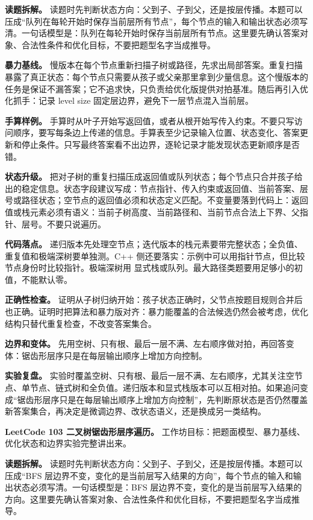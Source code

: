 \textbf{读题拆解。} 读题时先判断状态方向：父到子、子到父，还是按层传播。本题可以压成“队列在每轮开始时保存当前层所有节点”，每个节点的输入和输出状态必须写清。一句话模型是：队列在每轮开始时保存当前层所有节点。这里要先确认答案对象、合法性条件和优化目标，不要把题型名字当成推导。

\textbf{暴力基线。} 慢版本在每个节点重新扫描子树或路径，先求出局部答案。重复扫描暴露了真正状态：每个节点只需要从孩子或父亲那里拿到少量信息。这个慢版本的任务是保证不漏答案；它不追求快，只负责给优化版提供对拍基准。随后再引入优化抓手：记录 level size 固定层边界，避免下一层节点混入当前层。

\textbf{手算样例。} 手算时从叶子开始写返回值，或者从根开始写传入约束。不要只写访问顺序，要写每条边上传递的信息。手算表至少记录输入位置、状态变化、答案更新和停止条件。只写最终答案看不出边界，逐轮记录才能发现状态更新顺序是否错。

\textbf{状态升级。} 把对子树的重复扫描压成返回值或队列状态；每个节点只合并孩子给出的稳定信息。状态字段建议写成：节点指针、传入约束或返回值、当前答案、层号或路径状态；空节点的返回值必须和状态定义匹配。不变量要落到代码上：返回值或栈元素必须有语义：当前子树高度、当前路径和、当前节点合法上下界、父指针、层号。不要只说遍历。

\textbf{代码落点。} 递归版本先处理空节点；迭代版本的栈元素要带完整状态；全负值、重复值和极端深树要单独测。C++ 侧还要落实：示例中可以用指针节点，但比较节点身份时比较指针。极端深树用  显式栈或队列。最大路径类题要用足够小的初值，不能默认零。

\textbf{正确性检查。} 证明从子树归纳开始：孩子状态正确时，父节点按题目规则合并后也正确。证明时把算法和暴力版对齐：暴力能覆盖的合法候选仍然会被考虑，优化结构只替代重复检查，不改变答案集合。

\textbf{边界和变体。} 先用空树、只有根、最后一层不满、左右顺序做对拍，再回答变体：锯齿形层序只是在每层输出顺序上增加方向控制。

\textbf{实验复盘。} 实验时覆盖空树、只有根、最后一层不满、左右顺序，尤其关注空节点、单节点、链式树和全负值。递归版本和显式栈版本可以互相对拍。如果追问变成“锯齿形层序只是在每层输出顺序上增加方向控制”，先判断原状态是否仍然覆盖新答案集合，再决定是微调边界、改状态语义，还是换成另一类结构。

\noindent\textbf{LeetCode 103 二叉树锯齿形层序遍历。} 工作坊目标：把题面模型、暴力基线、优化状态和边界实验完整讲出来。

\textbf{读题拆解。} 读题时先判断状态方向：父到子、子到父，还是按层传播。本题可以压成“BFS 层边界不变，变化的是当前层写入结果的方向”，每个节点的输入和输出状态必须写清。一句话模型是：BFS 层边界不变，变化的是当前层写入结果的方向。这里要先确认答案对象、合法性条件和优化目标，不要把题型名字当成推导。

